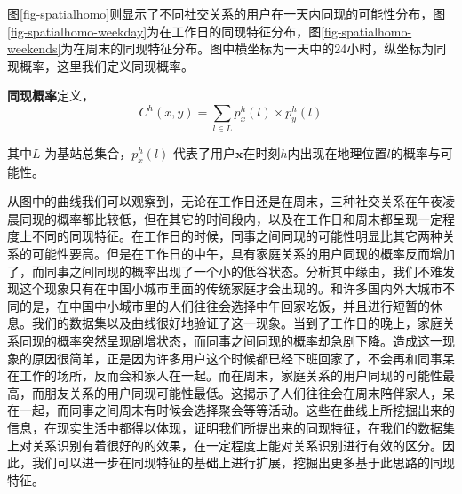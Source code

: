 图\ref{fig-spatialhomo}则显示了不同社交关系的用户在一天内同现的可能性分布，图\ref{fig-spatialhomo-weekday}为在工作日的同现特征分布，图\ref{fig-spatialhomo-weekends}为在周末的同现特征分布。图中横坐标为一天中的24小时，纵坐标为同现概率，这里我们定义同现概率。



\begin{definition}
    \label{spatial-homo-concept}
    \textbf{同现概率}定义，
    \begin{equation}
        C^{h}(x,y) = \sum_{l \in L}p_{x}^{h}(l) \times p_{y}^{h}(l)
    \end{equation}
\end{definition}


其中$L$ 为基站总集合，$p_{x}^{h}(l)$ 代表了用户$\bm{x}$在时刻$h$内出现在地理位置$l$的概率与可能性。

从图中的曲线我们可以观察到，无论在工作日还是在周末，三种社交关系在午夜凌晨同现的概率都比较低，但在其它的时间段内，以及在工作日和周末都呈现一定程度上不同的同现特征。在工作日的时候，同事之间同现的可能性明显比其它两种关系的可能性要高。但是在工作日的中午，具有家庭关系的用户同现的概率反而增加了，而同事之间同现的概率出现了一个小的低谷状态。分析其中缘由，我们不难发现这个现象只有在中国小城市里面的传统家庭才会出现的。和许多国内外大城市不同的是，在中国中小城市里的人们往往会选择中午回家吃饭，并且进行短暂的休息。我们的数据集以及曲线很好地验证了这一现象。当到了工作日的晚上，家庭关系同现的概率突然呈现剧增状态，而同事之间同现的概率却急剧下降。造成这一现象的原因很简单，正是因为许多用户这个时候都已经下班回家了，不会再和同事呆在工作的场所，反而会和家人在一起。而在周末，家庭关系的用户同现的可能性最高，而朋友关系的用户同现可能性最低。这揭示了人们往往会在周末陪伴家人，呆在一起，而同事之间周末有时候会选择聚会等等活动。这些在曲线上所挖掘出来的信息，在现实生活中都得以体现，证明我们所提出来的同现特征，在我们的数据集上对关系识别有着很好的的效果，在一定程度上能对关系识别进行有效的区分。因此，我们可以进一步在同现特征的基础上进行扩展，挖掘出更多基于此思路的同现特征。




